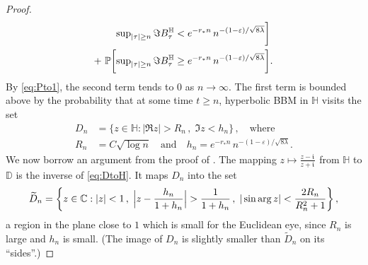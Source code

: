 \documentclass[12pt]{amsart}
\newcommand\AND{\quad\text{and}\quad}
\newcommand\BB{\textit{\textbf{B}}}
\newcommand\C{\mathbb C}
\newcommand\DD{\mathbb D}
\newcommand\ep{\varepsilon}
\newcommand\HH{\mathbb H}
\newcommand\im{\mathfrak{i}\,}
\newcommand\Prob{\mathbb P}
\newcommand\wt{\widetilde}
\numberwithin{theorem}{section}
\theoremstyle{definition}
\begin{document}
\begin{proof}
$$\begin{aligned}
\;\;
\sup\nolimits_{|\tau| \ge n} \Im \BB_{\tau}^{\HH} < e^{-r_*n}\, n^{-(1-\ep)/\sqrt{8\lambda}} \biggr]
&\ \\ + \ 
\Prob\biggl[ \sup\nolimits_{|\tau| \ge n} \Im \BB_{\tau}^{\HH} 
             \ge e^{-r_*n}\, n^{-(1-\ep)/\sqrt{8\lambda}}\biggr]&.
\end{aligned}
$$
By \eqref{eq:Pto1}, the second term tends to $0$ as $n \to \infty$.
The first term is bounded above by the probability that at some time $t \ge n$, hyperbolic 
BBM in $\HH$ visits the set 
$$
\begin{aligned}
D_n &= \{ z \in \HH : |\Re z| > R_n \,,\; \Im z < h_n\}\,, \quad \text{where}\\ 
R_n &= C\sqrt{\log n} \AND h_n = e^{-r_*n}\, n^{-(1-\ep)/\sqrt{8\lambda}}.
\end{aligned}
$$
We now borrow an argument from the proof of \cite[Prop. 4]{LS}. 
The mapping $z \mapsto \frac{z-\im}{z+\im}$ from $\HH$ to $\DD$ is the inverse of \eqref{eq:DtoH}.
It maps $D_n$ into the set  
$$
\wt D_n = \left\{ z \in \C : |z| < 1\,,\; \Bigl|z - \frac{h_n}{1+h_n}\Bigr| > \frac{1}{1+h_n}\,,\;
|\sin \arg z| < \frac{2R_n}{R_n^2+1} \right\}, 
$$
a region in the plane close to $1$ which is small for the Euclidean eye, since $R_n$ is large 
and $h_n$ is small. (The image of $D_n$ is slightly smaller than $\wt D_n$ on its ``sides''.)


\end{proof}
\end{document}
